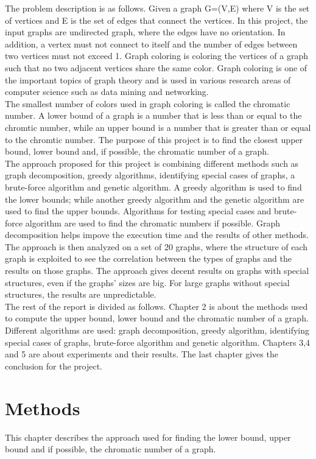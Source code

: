 \documentclass[a4paper]{report}
\begin{document}
	The problem description is as follows. Given a graph G=(V,E) where V is the set of vertices and E is the set of edges that connect the vertices. In this project, the input graphs are undirected graph, where the edges have no orientation. In addition, a vertex must not connect to itself and the number of edges between two vertices must not exceed 1.  Graph coloring is coloring the vertices of a graph such that no two adjacent vertices share the same color. Graph coloring is one of the important topics of graph theory and is used in various research areas of computer science such as data mining and networking.\\
	The smallest number of colors used in graph coloring is called the chromatic number. A lower bound of a graph is a number that is less than or equal to the chromtic number, while an upper bound is a number that is greater than or equal to the chromtic number. The purpose of this project is to find the closest upper bound, lower bound and, if possible, the chromatic number of a graph.\\
	
	The approach proposed for this project is combining different methods such as graph decomposition, greedy algorithms, identifying special cases of graphs, a brute-force algorithm and genetic algorithm. A greedy algorithm is used to find the lower bounds; while another greedy algorithm and the genetic algorithm are used to find the upper bounds. Algorithms for testing special cases and brute-force algorithm are used to find the chromatic numbers if possible. Graph decomposition helps impove the execution time and the results of other methods. The approach is then analyzed on a set of 20 graphs, where the structure of each graph is exploited to see the correlation between the types of graphs and the results on those graphs. The approach gives decent results on graphs with special structures, even if the graphs' sizes are big. For large graphs without special structures, the results are unpredictable. \\

	The rest of the report is divided as follows. Chapter 2 is about the methods used to compute the upper bound, lower bound and the chromatic number of a graph. Different algorithms are used: graph decomposition, greedy algorithm, identifying special cases of graphs, brute-force algorithm and genetic algorithm. Chapters 3,4 and 5 are about experiments and their results. The last chapter gives the conclusion for the project.
	
	\chapter{Methods}
	This chapter describes the approach used for finding the lower bound, upper bound and if possible, the chromatic number of a graph. 
\end{document}
